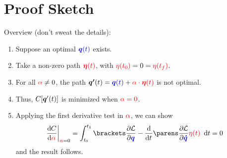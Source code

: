 \documentclass{fkpresentation}
\begin{document}
\section{Proof Sketch}
\begin{frame}{Overview (don't sweat the details):}
  \begin{enumerate}
    \item Suppose an optimal $\color{blue} \bm q(t)$ exists.
    \item Take a non-zero path $\color{red} \bm \eta(t)$, with
      ${\color{red}\eta(t_0)} = 0 = {\color{red}\eta(t_f)}$.
    \item For all ${\color{red}\alpha} \neq 0$, the path $\bm{q'}(t) =
      {\color{blue} \bm q(t)} + {\color{red} \alpha \cdot \bm{\eta}(t)}$
      is not optimal.
    \item Thus, $C[\bm q'(t)]$ is minimized when $\color{red}\alpha =
      0$.
    \item Applying the first derivative test in $\color{red} \alpha$,
      we can show
      \[
        \od{C}{{\color{red}\alpha}} \bigg\vert_{{\color{red}\alpha}=0}
        = \int_{t_0}^{t_1} \bk{\pd{\mc L}{\color{blue} \Qq} -
          \od{}{t}\pn{\pd{\mc L}{\color{blue} \bm{\dot q}}}}
        {\color{red}\eta(t)} \dd t = 0
      \]
      and the result follows.
  \end{enumerate}
\end{frame}
\end{document}
